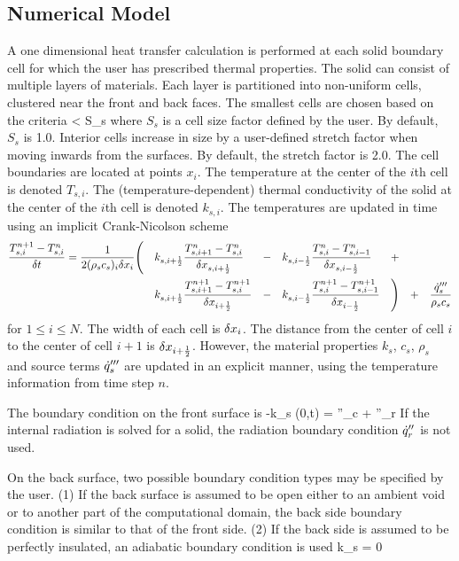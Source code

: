 \subsection{Numerical Model}

A one dimensional heat transfer calculation is performed at each solid
boundary cell for which the user has prescribed thermal
properties. The solid can consist of multiple layers of materials.
Each layer is partitioned into non-uniform cells, clustered near the
front and back faces.  The smallest cells are chosen based on the
criteria
\be \dx < S_s \ee
where $S_s$ is a cell size factor defined by the user. By default,
$S_s$ is 1.0.  Interior cells increase in size by a user-defined
stretch factor when moving inwards from the surfaces. By default, the
stretch factor is 2.0. The cell boundaries are located at points
$x_i$. The temperature at the center of the $i$th cell is denoted $T_{s,i}$.
The (temperature-dependent) thermal conductivity of the solid
at the center of the $i$th cell is denoted $k_{s,i}$.
The temperatures are updated in time using an implicit
Crank-Nicolson scheme
\begin{align}
    \frac{T_{s,i}^{n+1}-T_{s,i}^n}{\delta t} &= \frac{1}{2 (\rho_s c_s)_i \delta x_{i} }
 \Bigg(
     &&k_{s,i+\frac{1}{2}}\frac{T_{s,i+1}^n-T_{s,i}^n}{\delta x_{s,i+\frac{1}{2}}}  &-&&& k_{s,i-\frac{1}{2}}\frac{T_{s,i}^n-T_{s,i-1}^n}{\delta x_{s,i-\frac{1}{2}}} &&+ && &&\notag\\
    &&&k_{s,i+\frac{1}{2}}\frac{T_{s,i+1}^{n+1} - T_{s,i}^{n+1}}{\delta x_{i+\frac{1}{2}}} &-&&& k_{s,i-\frac{1}{2}}\frac{T_{s,i}^{n+1}-T_{s,i-1}^{n+1}}{\delta x_{i-\frac{1}{2}}} &&
 \Bigg)&&
    + && \frac{\dot{q}_s'''}{\rho_s c_s}
\end{align}
for $1 \le i \le N$. The width of each cell is $\delta x_i$. The distance
from the center of cell $i$ to the center of cell $i+1$ is
$\delta x_{i+\frac{1}{2}}$. However, the material properties $k_s$, $c_s$, $\rho_s$
and source terms $\dot{q}_s'''$ are updated in an explicit manner, using
the temperature information from time step $n$.


The boundary condition on the front surface is
\be  -k_s (0,t) =  \dq''_c + \dq''_r \ee
If the internal radiation is solved for a solid, the radiation
boundary condition $\dot{q}''_r$ is not used.

On the back surface, two possible boundary condition types may be
specified by the user. (1) If the back surface is assumed to be open
either to an ambient
void or to another part of the computational domain,
the back side boundary condition is similar to that of
the front side. (2) If the back side is assumed to be perfectly insulated,
an adiabatic boundary condition is used
\be  k_s  =  0 \ee

